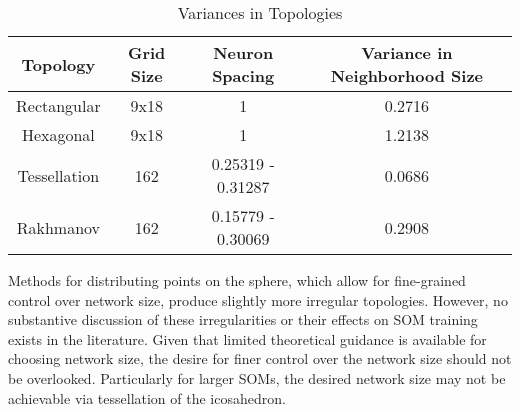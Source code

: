 \begin{table}[htbp]
\caption{Variances in Topologies}
\begin{center}
\begin{tabular}{|c|c|c|c|}
\hline
Topology&Grid Size&Neuron Spacing&Variance in Neighborhood Size\\
\hline
Rectangular&9x18&1&0.2716\\
Hexagonal&9x18&1&1.2138\\
Tessellation&162&0.25319 - 0.31287& 0.0686\\
Rakhmanov&162&0.15779 - 0.30069& 0.2908\\
\hline
\end{tabular}
\end{center}
\label{table1}
\end{table}

Methods for distributing points on the sphere, which allow for fine-grained
control over network size, produce slightly more irregular topologies.  However,
no substantive discussion of these irregularities or their effects on SOM
training exists in the literature. Given that limited theoretical guidance is available
for choosing network size, the desire for finer control over the network size
should not be overlooked. Particularly for larger SOMs, the desired network size
may not be achievable via tessellation of the icosahedron.


